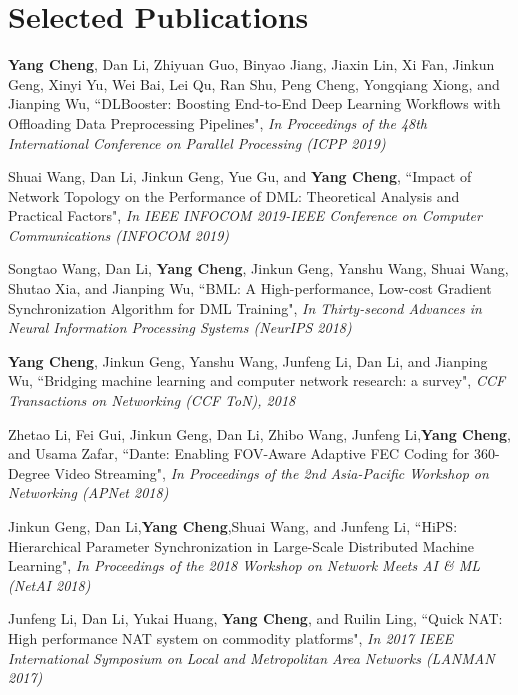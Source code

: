 \documentclass{resume}
\newcommand{\authorlist}[1]{{\textcolor[rgb]{0,0,0}{#1}}}
\newcommand{\papertitle}[1]{{``#1"}}
\newcommand{\publicationaddr}[1]{{\textit{#1}}}
\begin{document}
\section{Selected Publications}

\begin{enumerate}[label={[\arabic*]}, noitemsep]
	
	\item \authorlist{\textbf{Yang Cheng}, Dan Li, Zhiyuan Guo, Binyao Jiang, Jiaxin Lin, Xi Fan, Jinkun Geng, Xinyi Yu, Wei Bai, Lei Qu, Ran Shu, Peng Cheng, Yongqiang Xiong, and Jianping Wu}, \papertitle{DLBooster: Boosting End-to-End Deep Learning Workflows with Offloading Data Preprocessing Pipelines}, \publicationaddr{In Proceedings of the 48th International Conference on Parallel Processing (ICPP 2019)}
	
	\item \authorlist{Shuai Wang, Dan Li, Jinkun Geng, Yue Gu, and \textbf{Yang Cheng}}, \papertitle{Impact of Network Topology on the Performance of DML: Theoretical Analysis and Practical Factors}, \publicationaddr{In IEEE INFOCOM 2019-IEEE Conference on Computer Communications (INFOCOM 2019)}
	
	\item \authorlist{Songtao Wang, Dan Li, \textbf{Yang Cheng}, Jinkun Geng, Yanshu Wang, Shuai Wang, Shutao Xia, and Jianping Wu}, \papertitle{BML: A High-performance, Low-cost Gradient Synchronization Algorithm for DML Training}, \publicationaddr{In Thirty-second Advances in Neural Information Processing Systems (NeurIPS 2018)}
	
	\item \authorlist{\textbf{Yang Cheng}, Jinkun Geng, Yanshu Wang, Junfeng Li, Dan Li, and Jianping Wu}, \papertitle{Bridging machine learning and computer network research: a survey}, \publicationaddr{CCF Transactions on Networking (CCF ToN), 2018}
	
	\item \authorlist{Zhetao Li, Fei Gui, Jinkun Geng, Dan Li, Zhibo Wang, Junfeng Li,\textbf{Yang Cheng}, and Usama Zafar}, \papertitle{Dante: Enabling FOV-Aware Adaptive FEC Coding for 360-Degree Video Streaming}, \publicationaddr{In Proceedings of the 2nd Asia-Pacific Workshop on Networking  (APNet 2018)}
	
	\item \authorlist{Jinkun Geng, Dan Li,\textbf{Yang Cheng},Shuai Wang, and Junfeng Li}, \papertitle{HiPS: Hierarchical Parameter Synchronization in Large-Scale Distributed Machine Learning}, \publicationaddr{In Proceedings of the 2018 Workshop on Network Meets AI \& ML (NetAI 2018)}
	
	\item \authorlist{Junfeng Li, Dan Li, Yukai Huang, \textbf{Yang Cheng}, and Ruilin Ling}, \papertitle{Quick NAT: High performance NAT system on commodity platforms}, \publicationaddr{In 2017 IEEE International Symposium on Local and Metropolitan Area Networks (LANMAN 2017)}
	
\end{enumerate}
\end{document}
